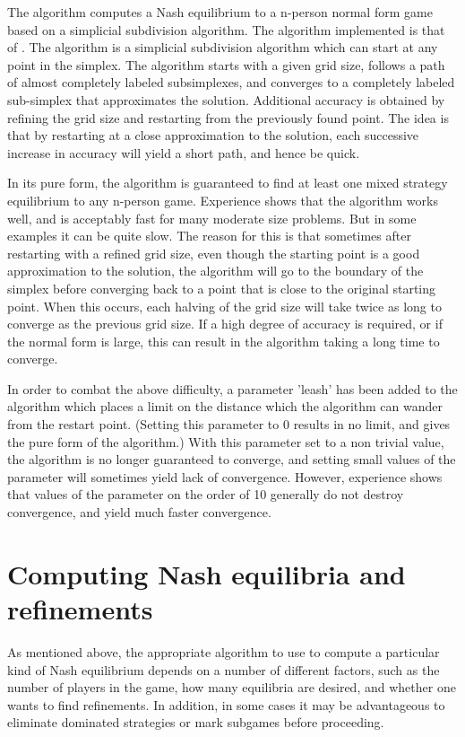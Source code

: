 The  algorithm computes a Nash equilibrium to a
n-person normal form game based on a simplicial subdivision algorithm.
The algorithm implemented is that of \cite{VTH:1987}.  The algorithm
is a simplicial subdivision algorithm which can start at any point in
the simplex.  The algorithm starts with a given grid size, follows a
path of almost completely labeled subsimplexes, and converges to a
completely labeled sub-simplex that approximates the solution.
Additional accuracy is obtained by refining the grid size and
restarting from the previously found point.  The idea is that by
restarting at a close approximation to the solution, each successive
increase in accuracy will yield a short path, and hence be quick.

In its pure form, the algorithm is guaranteed to find at least one
mixed strategy equilibrium to any n-person game.  Experience shows
that the algorithm works well, and is acceptably fast for many
moderate size problems.  But in some examples it can be quite slow.
The reason for this is that sometimes after restarting with a refined
grid size, even though the starting point is a good approximation to
the solution, the algorithm will go to the boundary of the simplex
before converging back to a point that is close to the original
starting point.  When this occurs, each halving of the grid size will
take twice as long to converge as the previous grid size.  If a high
degree of accuracy is required, or if the normal form is large, this
can result in the algorithm taking a long time to converge.

In order to combat the above difficulty, a parameter 'leash' has been
added to the algorithm which places a limit on the distance which the
algorithm can wander from the restart point. (Setting this parameter
to 0 results in no limit, and gives the pure form of the algorithm.)
With this parameter set to a non trivial value, the algorithm is no
longer guaranteed to converge, and setting small values of the
parameter will sometimes yield lack of convergence.  However,
experience shows that values of the parameter on the order of 10
generally do not destroy convergence, and yield much faster
convergence.

\section{Computing Nash equilibria and refinements}

As mentioned above, the appropriate algorithm to use to compute a
particular kind of Nash equilibrium depends on a number of different
factors, such as the number of players in the game, how many
equilibria are desired, and whether one wants to find refinements.  In
addition, in some cases it may be advantageous to eliminate dominated
strategies or mark subgames before proceeding.

